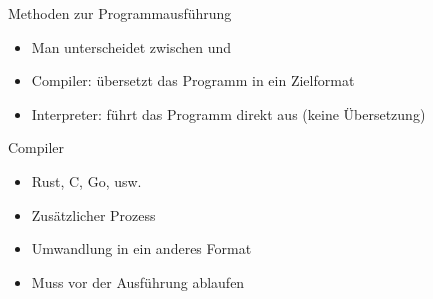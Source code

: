 \begin{frame}{Methoden zur Programmausführung}
	\begin{itemize}
		\item Man unterscheidet zwischen  und 
		\item Compiler: übersetzt das Programm in ein Zielformat
		\item Interpreter: führt das Programm direkt aus (keine Übersetzung)
	\end{itemize}
\end{frame}

\begin{frame}{Compiler}
	\begin{minipage}{.35\textwidth}
	\end{minipage}%
	\hfill
	\begin{minipage}{.35\textwidth}
	\end{minipage}

	\begin{itemize}
		\item Rust, C, Go, usw.
		\item Zusätzlicher Prozess
		\item Umwandlung in ein anderes Format
		\item[\Rightarrow] Muss vor der Ausführung ablaufen
	\end{itemize}
\end{frame}

